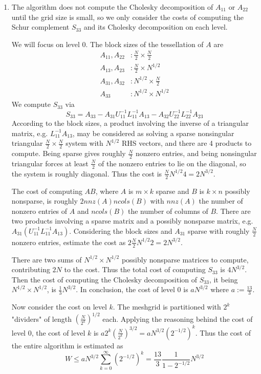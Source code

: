 \documentclass{article}
\newcommand{\br}[1]{\left(#1\right)}
\newcommand{\inv}{^{-1}}
\begin{document}
\begin{enumerate}
	
	
	\pagebreak
	
	
	
	\item The algorithm does not compute the Cholesky decomposition of $A_{11}$ or $A_{22}$ until the grid size is small, so we only consider the costs of computing the Schur complement $S_{33}$ and its Cholesky decomposition on each level.
	
	We will focus on level 0. The block sizes of the tessellation of $A$ are
	\begin{align*}
		A_{11},A_{22}&: \frac N2\times\frac N2 \\
		A_{13},A_{23}&: \frac N2\times N^{1/2} \\
		A_{31},A_{32}&: N^{1/2}\times\frac N2 \\
		A_{33}&: N^{1/2}\times N^{1/2}
	\end{align*}
	We compute $S_{33}$ via
	\[S_{33} = A_{33} - A_{31}U_{11}\inv L_{11}\inv A_{13} - A_{32} U_{22}\inv L_{22}\inv A_{23}\]
	According to the block sizes, a product involving the inverse of a triangular matrix, e.g. $L_{11}\inv A_{13}$, may be considered as solving a sparse nonsingular triangular $\frac N2\times\frac N2$ system with $N^{1/2}$ RHS vectors, and there are 4 products to compute. Being sparse gives roughly $\frac N2$ nonzero entries, and being nonsingular triangular forces at least $\frac N2$ of the nonzero entries to lie on the diagonal, so the system is roughly diagonal. Thus the cost is $\frac N2N^{1/2}4=2N^{3/2}$.
	
	The cost of computing $AB$, where $A$ is $m\times k$ sparse and $B$ is $k\times n$ possibly nonsparse, is roughly $2nnz(A)ncols(B)$ with $nnz(A)$ the number of nonzero entries of $A$ and $ncols(B)$ the number of columns of $B$. There are two products involving a sparse matrix and a possibly nonsparse matrix, e.g. $A_{31}(U_{11}\inv L_{11}\inv A_{13})$. Considering the block sizes and $A_{31}$ sparse with roughly $\frac N2$ nonzero entries, estimate the cost as $2\frac N2N^{1/2}2=2N^{3/2}$.
	
	There are two sums of $N^{1/2}\times N^{1/2}$ possibly nonsparse matrices to compute, contributing $2N$ to the cost. Thus the total cost of computing $S_{33}$ is $4N^{3/2}$. Then the cost of computing the Cholesky decomposition of $S_{33}$, it being $N^{1/2}\times N^{1/2}$, is $\frac13N^{3/2}$. In conclusion, the cost of level 0 is $aN^{3/2}$ where $a:=\frac{13}{3}$.
	
	Now consider the cost on level $k$. The meshgrid is partitioned with $2^k$ "dividers" of length $\br{\frac{N}{2^k}}^{1/2}$ each. Applying the reasoning behind the cost of level 0, the cost of level $k$ is $a2^k\br{\frac{N}{2^k}}^{3/2} = aN^{3/2}(2^{-1/2})^k$. Thus the cost of the entire algorithm is estimated as
	\[W \le aN^{3/2}\sum_{k=0}^\infty (2^{-1/2})^k = \frac{13}{3}\frac{1}{1-2^{-1/2}}N^{3/2}\]
	
	
	
\end{enumerate}
	
	
\end{document}
